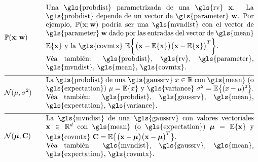 \newpage
\begin{align} 
	&\prob{\featurevec;\weights} &\quad & \parbox{.85\textwidth}{Una \gls{probdist} parametrizada de una \gls{rv} $\featurevec$. 
		La \gls{probdist} depende de un vector de \gls{parameter} $\weights$. Por ejemplo, $\prob{\featurevec;\weights}$ podría ser una 
		\gls{mvndist} con el vector de \gls{parameter} $\weights$ dado por las entradas del vector de \gls{mean} $\expect \{ \featurevec \}$ 
		y la \gls{covmtx} $\expect \bigg \{ \big( \featurevec - \expect \{ \featurevec \}\big) \big( \featurevec - \expect \{ \featurevec \}\big)^{T}  \bigg\}$.
		\\ Véa también: \gls{probdist}, \gls{rv}, \gls{parameter}, \gls{mvndist}, \gls{mean}, \gls{covmtx}.} \nonumber \\[2mm] \hline \nonumber\\[-5mm]
	&\mathcal{N}(\mu, \sigma^{2}) &\quad & \parbox{.85\textwidth}{La \gls{probdist} de una 
		\gls{gaussrv} $\feature \in \mathbb{R}$ con \gls{mean} (o \gls{expectation}) $\mu= \expect \{ \feature \}$ 
		y \gls{variance} $\sigma^{2} = \expect \big\{ ( \feature - \mu )^2 \big\}$.
		\\ Véa también: \gls{probdist}, \gls{gaussrv}, \gls{mean}, \gls{expectation}, \gls{variance}.} \nonumber \\[2mm] \hline \nonumber\\[-5mm]
	&\mathcal{N}(\meanvecgeneric, \mathbf{C}) &\quad & \parbox{.85\textwidth}{La \gls{mvndist} de una \gls{gaussrv} con valores vectoriales 
		$\featurevec \in \mathbb{R}^{\featuredim}$ con \gls{mean} (o \gls{expectation}) $\clustermean= \expect \{ \featurevec \}$ 
		y \gls{covmtx} $\mathbf{C} = \expect \big\{ \big( \featurevec - \clustermean \big)\big( \featurevec - \clustermean \big)^{T} \big\}$.
		\\ Véa también: \gls{mvndist}, \gls{gaussrv}, \gls{mean}, \gls{expectation}, \gls{covmtx}.} \nonumber                                             
\end{align}





\newpage
